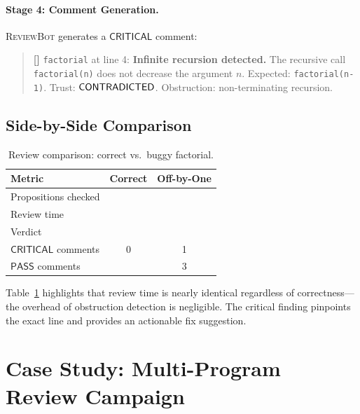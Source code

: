\documentclass[11pt]{article}
\newcommand{\ReviewBot}{\textsc{ReviewBot}}
\newcommand{\SevCritical}{\mathsf{CRITICAL}}
\newcommand{\SevPass}{\mathsf{PASS}}
\begin{document}
\paragraph{Stage 4: Comment Generation.}
\ReviewBot{} generates a $\SevCritical$ comment:
\begin{quote}
\small
\textbf{[\SevCritical{}]} \texttt{factorial} at line 4: \textbf{Infinite
recursion detected.} The recursive call \texttt{factorial(n)} does not
decrease the argument $n$. Expected: \texttt{factorial(n-1)}.
Trust: $\mathsf{CONTRADICTED}$. Obstruction: non-terminating recursion.
\end{quote}

\subsection{Side-by-Side Comparison}

\begin{table}[t]
\centering
\caption{Review comparison: correct vs.\ buggy factorial.}
\label{tab:factorial-comparison}
\begin{tabular}{lcc}
\toprule
\textbf{Metric} & \textbf{Correct} & \textbf{Off-by-One} \\
\midrule
Propositions checked & \ppLXVIIrevfactorialProps{} &
  \ppLXVIIrevfactorialoffbyoneProps{} \\
Review time & \ppLXVIIrevfactorialTime{} &
  \ppLXVIIrevfactorialoffbyoneTime{} \\
Verdict & \ppLXVIIrevfactorialVerdict{} &
  \ppLXVIIrevfactorialoffbyoneVerdict{} \\
$\SevCritical$ comments & 0 & 1 \\
$\SevPass$ comments & \ppLXVIIrevfactorialProps{} & 3 \\
\bottomrule
\end{tabular}
\end{table}

Table~\ref{tab:factorial-comparison} highlights that review time is nearly
identical regardless of correctness---the overhead of obstruction detection
is negligible. The critical finding pinpoints the exact line and provides
an actionable fix suggestion.

\section{Case Study: Multi-Program Review Campaign}\label{sec:case-study}
\end{document}
